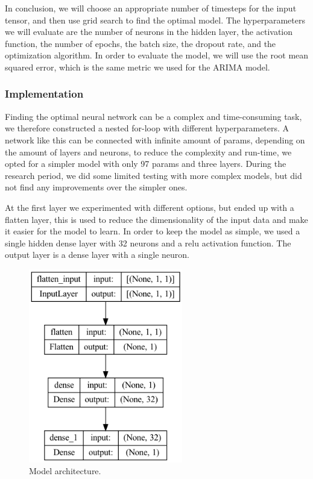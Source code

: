 In conclusion, we will choose an appropriate number of timesteps for the input tensor, and then use grid search to find the optimal model. The hyperparameters we will evaluate are the number of neurons in the hidden layer, the activation function, the number of epochs, the batch size, the dropout rate, and the optimization algorithm. In order to evaluate the model, we will use the root mean squared error, which is the same metric we used for the ARIMA model.

\subsubsection{Implementation}
Finding the optimal neural network can be a complex and time-consuming task, we therefore constructed a nested for-loop with different hyperparameters. A network like this can be connected with infinite amount of params, depending on the amount of layers and neurons, to reduce the complexity and run-time, we opted for a simpler model with only 97 params and three layers. During the research period, we did some limited testing with more complex models, but did not find any improvements over the simpler ones.

At the first layer we experimented with different options, but ended up with a flatten layer, this is used to reduce the dimensionality of the input data and make it easier for the model to learn. In order to keep the model as simple, we used a single hidden dense layer with 32 neurons and a relu activation function. The output layer is a dense layer with a single neuron.
\begin{figure}[H]
    \centering
    \includegraphics[width=0.6\textwidth]{data/Figures/Neural networks/model_tf1.png}
    \caption{Model architecture.}\label{fig:model_tf1}
\end{figure}

